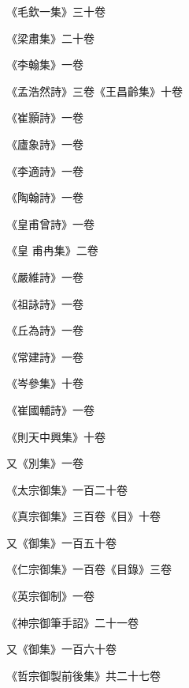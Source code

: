 \begin{pinyinscope}
 《毛欽一集》三十卷



 《梁肅集》二十卷



 《李翰集》一卷



 《孟浩然詩》三卷《王昌齡集》十卷



 《崔顥詩》一卷



 《廬象詩》一卷



 《李適詩》一卷



 《陶翰詩》一卷



 《皇甫曾詩》一卷



 《皇
 甫冉集》二卷



 《嚴維詩》一卷



 《祖詠詩》一卷



 《丘為詩》一卷



 《常建詩》一卷



 《岑參集》十卷



 《崔國輔詩》一卷



 《則天中興集》十卷



 又《別集》一卷



 《太宗御集》一百二十卷



 《真宗御集》三百卷《目》十卷



 又《御集》一百五十卷



 《仁宗御集》一百卷《目錄》三卷



 《英宗御制》一卷



 《神宗御筆手詔》二十一卷



 又《御集》一百六十卷



 《哲宗御製前後集》共二十七卷




\end{pinyinscope}
